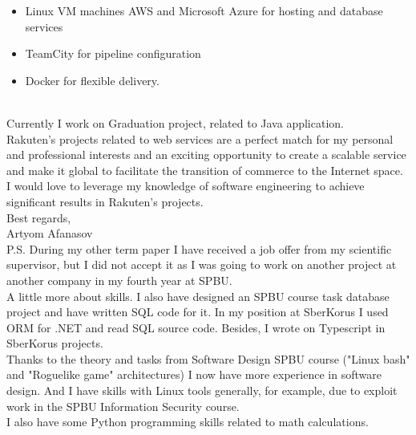 \documentclass[
	a4paper,
]{fortysecondscv}
\begin{document}
\begin{itemize}
    \item \colorbox{cvsidecolor}{Linux VM machines} \colorbox{cvsidecolor}{AWS} and \colorbox{cvsidecolor}{Microsoft Azure} for hosting and database services 
    \item \colorbox{cvsidecolor}{TeamCity} for pipeline configuration
    \item \colorbox{cvsidecolor}{Docker} for flexible delivery.
\end{itemize}

\\ Currently I work on Graduation project, related to \colorbox{cvsidecolor}{Java} application. \\

Rakuten's projects related to web services are a perfect match for my personal and professional interests and an exciting opportunity to create a scalable service and make it global to facilitate the transition of commerce to the Internet space. I would love to leverage my knowledge of software engineering to achieve significant results in Rakuten's projects.\\

Best regards,\\
Artyom Afanasov\\

P.S. During my other term paper I have received a job offer from my scientific supervisor, but I did not accept it as I was going to work on another project at another company in my fourth year at SPBU.\\

A little more about skills. I also have designed an SPBU course task database project and have written \colorbox{cvsidecolor}{SQL} code for it. In my position at SberKorus I used ORM for .NET and read SQL source code. Besides, I wrote on \colorbox{cvsidecolor}{Typescript} in SberKorus projects.\\
Thanks to the theory and tasks from Software Design SPBU course ("Linux bash" and "Roguelike game" architectures) I now have more experience in \colorbox{cvsidecolor}{software design}. And I have skills with \colorbox{cvsidecolor}{Linux} tools generally, for example, due to exploit work in the SPBU Information Security course. \\
I also have some \colorbox{cvsidecolor}{Python} programming skills related to math calculations.

\cvsignature
\end{document}
